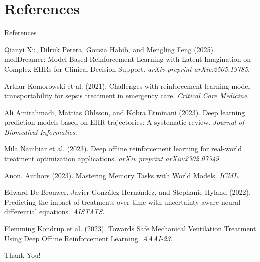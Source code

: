 \documentclass[11pt]{beamer}
\begin{document}
\section{References}
\begin{frame}{References}
\tiny
\begin{thebibliography}{9}

Qianyi Xu, Dilruk Perera, Gousia Habib, and Mengling Feng (2025).
\newblock medDreamer: Model-Based Reinforcement Learning with Latent Imagination on Complex EHRs for Clinical Decision Support.
\newblock \textit{arXiv preprint arXiv:2505.19785}.

Arthur Komorowski et al. (2021).
\newblock Challenges with reinforcement learning model transportability for sepsis treatment in emergency care.
\newblock \textit{Critical Care Medicine}.

Ali Amirahmadi, Mattias Ohlsson, and Kobra Etminani (2023).
\newblock Deep learning prediction models based on EHR trajectories: A systematic review.
\newblock \textit{Journal of Biomedical Informatics}.

Mila Nambiar et al. (2023).
\newblock Deep offline reinforcement learning for real-world treatment optimization applications.
\newblock \textit{arXiv preprint arXiv:2302.07549}.


Anon. Authors (2023).
\newblock Mastering Memory Tasks with World Models.
\newblock \textit{ICML}.

Edward De Brouwer, Javier González Hernández, and Stephanie Hyland (2022).
\newblock Predicting the impact of treatments over time with uncertainty aware neural differential equations.
\newblock \textit{AISTATS}.

Flemming Kondrup et al. (2023).
\newblock Towards Safe Mechanical Ventilation Treatment Using Deep Offline Reinforcement Learning.
\newblock \textit{AAAI-23}.

\end{thebibliography}
\end{frame}


\begin{frame}
\begin{center}
    \Huge{Thank You!}
\end{center}
\end{frame}
\end{document}
